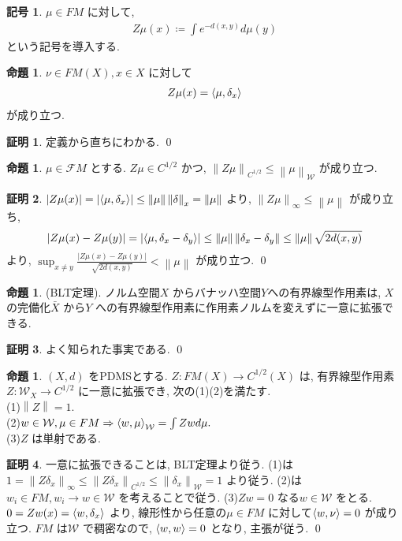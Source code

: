 \documentclass[10pt, fleqn, label-section=none]{bxjsarticle}
\theoremstyle{definition}
\newtheorem{prop}[dfn]{命題}
\newtheorem{notation}[dfn]{記号}
\newtheorem*{pf*}{証明}
\newcommand{\tbra}[1]{\mleft\langle#1\mright\rangle}
\newcommand{\abs}[1]{\left|#1\right|}
\newcommand{\norm}[1]{\left\|#1\right\|}
\newcommand{\naraba}{\Rightarrow}
\renewcommand{\;}{\, ; \,}
\begin{document}
\begin{notation}$\mu \in FM$ に対して, 
\begin{align*} Z\mu(x) \coloneqq \int e^{-d(x,y)} d\mu(y)\end{align*}
という記号を導入する. 
\end{notation}

\begin{prop}$\nu \in FM(X), x \in X$ に対して
\begin{align*} Z\mu(x) = \tbra{\mu, \delta_x} \end{align*}
が成り立つ. 
\end{prop}
\begin{pf*}
定義から直ちにわかる. 
\qed
\end{pf*}



\begin{prop}$\mu \in \mathcal FM$ とする. $Z \mu \in C^{1/2}$ かつ, $\norm{Z \mu}_{C^{1/2}} \leq \norm{\mu}_{\mathcal W}$ が成り立つ. 

\end{prop}
\begin{pf*}
$\abs{Z \mu (x)} = \abs{\tbra{\mu, \delta_x}} \leq \norm \mu \norm \delta_x = \norm \mu$ より, $\norm{Z\mu}_\infty \leq \norm \mu$ が成り立ち, 
\begin{align*} \abs{Z \mu (x) - Z \mu (y)} = \abs{\tbra{\mu, \delta_x - \delta_y}} \leq \norm \mu \norm{\delta_x - \delta_y} \leq \norm \mu \sqrt{2 d(x, y) }\end{align*}
より, $\sup_{x \neq y} \frac{\abs{Z\mu (x) - Z \mu(y)}}{\sqrt{2d(x, y)}} < \norm \mu$
が成り立つ. 
\qed
\end{pf*}

\begin{prop}(BLT定理). ノルム空間$X$ からバナッハ空間$Y$への有界線型作用素は, $X$ の完備化$\bar X$ から$Y$ への有界線型作用素に作用素ノルムを変えずに一意に拡張できる.

\end{prop}
\begin{pf*}
よく知られた事実である. 
\qed
\end{pf*}

\begin{prop}$(X,d)$ をPDMSとする. $Z: FM(X) \rightarrow C^{1/2}(X)$ は, 有界線型作用素$Z: \mathcal W_X \rightarrow C^{1/2}$ に一意に拡張でき, 次の(1)(2)を満たす. \\
(1)$\norm Z = 1.$ \\
(2)$w \in \mathcal W, \mu \in FM \naraba \tbra{w, \mu}_\mathcal W = \int Zw d\mu.$ \\
(3)$Z$ は単射である. 
\end{prop}
\begin{pf*} 一意に拡張できることは, BLT定理より従う. (1)は$1 = \norm{Z \delta_x}_\infty \leq \norm{Z \delta_x}_{C^{1/2}} \leq \norm{\delta_x}_{\mathcal W} = 1$ より従う. (2)は$w_i \in FM, w_i \rightarrow w \in \mathcal W$ を考えることで従う. (3)$Zw = 0$ なる$w \in \mathcal W$ をとる. $0 = Zw(x) = \tbra{w, \delta_x}$ より, 線形性から任意の$\mu \in FM$ に対して$\tbra{w, \nu} = 0$ が成り立つ. $FM$ は$\mathcal W$ で稠密なので, $\tbra{w, w} = 0$ となり, 主張が従う. 
\qed
\end{pf*}
\end{document}
